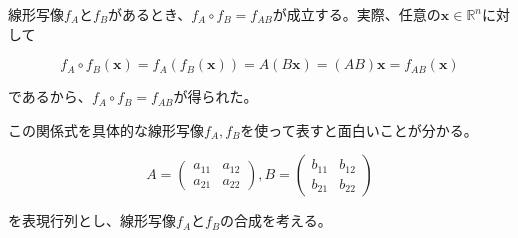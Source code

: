 \documentclass[dvipdfmx,autodetect-engine]{jsarticle}
\newcommand{\vecSet}[1]{\mathbb{R}^{#1}}
\begin{document}
線形写像$f_A$と$f_B$があるとき、$f_A \circ f_B = f_{AB}$が成立する。実際、任意の$\bm{x} \in \vecSet{n}$に対して

$$
f_A \circ f_B(\bm{x}) = f_A(f_B(\bm{x})) = A(B\bm{x}) = (AB)\bm{x} = f_{AB}(\bm{x})
$$

であるから、$f_A \circ f_B = f_{AB}$が得られた。

この関係式を具体的な線形写像$f_A, f_B$を使って表すと面白いことが分かる。

$$
A = \begin{pmatrix}
a_{11} & a_{12} \\
a_{21} & a_{22}
\end{pmatrix}, 
B = \begin{pmatrix}
b_{11} & b_{12} \\
b_{21} & b_{22}
\end{pmatrix}
$$

を表現行列とし、線形写像$f_A$と$f_B$の合成を考える。
\end{document}
